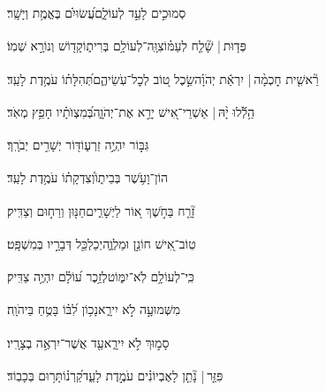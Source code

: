 \documentclass[12pt]{article}
\newcommand{\loc}[1]{\textsuperscript{\locf{#1}}}
\begin{document}
{\loc{ ח}~}‏סְמוּכִ֣ים לָעַ֣ד לְעוֹלָ֑ם{\hfill}עֲ֝שׂוּיִ֗ם בֶּאֱמֶ֥ת וְיָשָֽׁר׃\par

{\loc{ ט}~}‏פְּד֤וּת | {\hfill}שָׁ֘לַ֤ח לְעַמּ֗וֹ\newline\hspace*{.5em}צִוָּֽה־לְעוֹלָ֥ם בְּרִית֑וֹ{\hfill}קָד֖וֹשׁ וְנוֹרָ֣א שְׁמֽוֹ׃\par

{\loc{ י}~}‏רֵ֘אשִׁ֤ית חׇכְמָ֨ה | {\hfill}יִרְאַ֬ת יְהֹוָ֗ה\newline\hspace*{.5em}שֵׂ֣כֶל ט֭וֹב לְכׇל־עֹֽשֵׂיהֶ֑ם{\hfill}תְּ֝הִלָּת֗וֹ עֹמֶ֥דֶת לָעַֽד׃\par\pend
\ledpb
\pstart[\subsection*{\textcolor{red}{פרק קיב}}]\label{פרק קיב}
{\loc{ א}~}‏הַ֥לְﬞלוּ יָ֨הּ | \newline\hspace*{.5em}אַשְׁרֵי־אִ֭ישׁ יָרֵ֣א אֶת־יְהֹוָ֑ה{\hfill}בְּ֝מִצְוֺתָ֗יו חָפֵ֥ץ מְאֹֽד׃\par

{\loc{ ב}~}‏גִּבּ֣וֹר  יִהְיֶ֣ה זַרְע֑וֹ{\hfill}דּ֖וֹר יְשָׁרִ֣ים יְבֹרָֽךְ׃\par

{\loc{ ג}~}‏הוֹן־וָעֹ֥שֶׁר בְּבֵית֑וֹ{\hfill}וְ֝צִדְקָת֗וֹ עֹמֶ֥דֶת לָעַֽד׃\par

{\loc{ ד}~}‏זָ֘רַ֤ח בַּחֹ֣שֶׁךְ א֭וֹר לַיְשָׁרִ֑ים{\hfill}חַנּ֖וּן וְרַח֣וּם וְצַדִּֽיק׃\par

{\loc{ ה}~}‏טֽוֹב־אִ֭ישׁ חוֹנֵ֣ן וּמַלְוֶ֑ה{\hfill}יְכַלְכֵּ֖ל דְּבָרָ֣יו בְּמִשְׁפָּֽט׃\par

{\loc{ ו}~}‏כִּֽי־לְעוֹלָ֥ם לֹֽא־יִמּ֑וֹט{\hfill}לְזֵ֥כֶר ע֝וֹלָ֗ם יִהְיֶ֥ה צַדִּֽיק׃\par

{\loc{ ז}~}‏מִשְּׁמוּעָ֣ה  לֹ֣א יִירָ֑א{\hfill}נָכ֥וֹן לִ֝בּ֗וֹ בָּטֻ֥חַ בַּיהֹוָֽה׃\par

{\loc{ ח}~}‏סָמ֣וּךְ  לֹ֣א יִירָ֑א{\hfill}עַ֖ד אֲשֶׁר־יִרְאֶ֣ה בְצָרָֽיו׃\par

{\loc{ ט}~}‏פִּזַּ֤ר |  נָ֘תַ֤ן לָאֶבְיוֹנִ֗ים{\hfill} עֹמֶ֣דֶת לָעַ֑ד\newline\hspace*{.5em}קַ֝רְנ֗וֹ{\hfill}תָּר֥וּם בְּכָבֽוֹד׃\par
\end{document}
